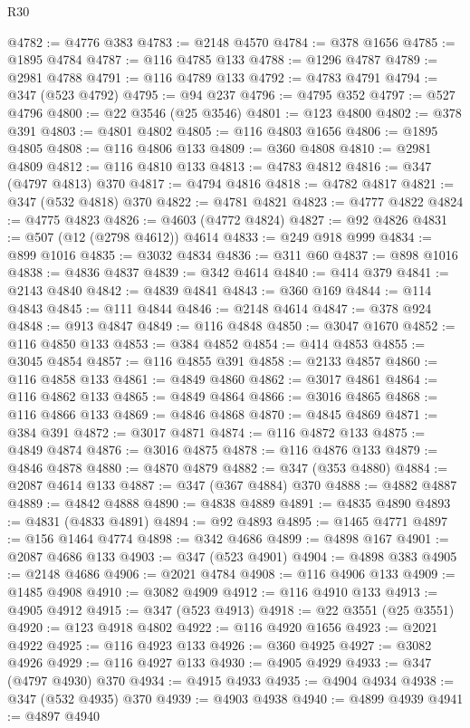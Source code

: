 \begin{lexlean}{R30}
\begin{coremodule}
@4782 := @4776 @383
@4783 := @2148 @4570
@4784 := @378 @1656
@4785 := @1895 @4784
@4787 := @116 @4785 @133
@4788 := @1296 @4787
@4789 := @2981 @4788
@4791 := @116 @4789 @133
@4792 := @4783 @4791
@4794 := @347 (@523 @4792)
@4795 := @94 @237
@4796 := @4795 @352
@4797 := @527 @4796
@4800 := @22 @3546 (@25 @3546)
@4801 := @123 @4800
@4802 := @378 @391
@4803 := @4801 @4802
@4805 := @116 @4803 @1656
@4806 := @1895 @4805
@4808 := @116 @4806 @133
@4809 := @360 @4808
@4810 := @2981 @4809
@4812 := @116 @4810 @133
@4813 := @4783 @4812
@4816 := @347 (@4797 @4813) @370
@4817 := @4794 @4816
@4818 := @4782 @4817
@4821 := @347 (@532 @4818) @370
@4822 := @4781 @4821
@4823 := @4777 @4822
@4824 := @4775 @4823
@4826 := @4603 (@4772 @4824)
@4827 := @92 @4826
@4831 := @507 (@12 (@2798 @4612)) @4614
@4833 := @249 @918 @999
@4834 := @899 @1016
@4835 := @3032 @4834
@4836 := @311 @60
@4837 := @898 @1016
@4838 := @4836 @4837
@4839 := @342 @4614
@4840 := @414 @379
@4841 := @2143 @4840
@4842 := @4839 @4841
@4843 := @360 @169
@4844 := @114 @4843
@4845 := @111 @4844
@4846 := @2148 @4614
@4847 := @378 @924
@4848 := @913 @4847
@4849 := @116 @4848
@4850 := @3047 @1670
@4852 := @116 @4850 @133
@4853 := @384 @4852
@4854 := @414 @4853
@4855 := @3045 @4854
@4857 := @116 @4855 @391
@4858 := @2133 @4857
@4860 := @116 @4858 @133
@4861 := @4849 @4860
@4862 := @3017 @4861
@4864 := @116 @4862 @133
@4865 := @4849 @4864
@4866 := @3016 @4865
@4868 := @116 @4866 @133
@4869 := @4846 @4868
@4870 := @4845 @4869
@4871 := @384 @391
@4872 := @3017 @4871
@4874 := @116 @4872 @133
@4875 := @4849 @4874
@4876 := @3016 @4875
@4878 := @116 @4876 @133
@4879 := @4846 @4878
@4880 := @4870 @4879
@4882 := @347 (@353 @4880)
@4884 := @2087 @4614 @133
@4887 := @347 (@367 @4884) @370
@4888 := @4882 @4887
@4889 := @4842 @4888
@4890 := @4838 @4889
@4891 := @4835 @4890
@4893 := @4831 (@4833 @4891)
@4894 := @92 @4893
@4895 := @1465 @4771
@4897 := @156 @1464 @4774
@4898 := @342 @4686
@4899 := @4898 @167
@4901 := @2087 @4686 @133
@4903 := @347 (@523 @4901)
@4904 := @4898 @383
@4905 := @2148 @4686
@4906 := @2021 @4784
@4908 := @116 @4906 @133
@4909 := @1485 @4908
@4910 := @3082 @4909
@4912 := @116 @4910 @133
@4913 := @4905 @4912
@4915 := @347 (@523 @4913)
@4918 := @22 @3551 (@25 @3551)
@4920 := @123 @4918 @4802
@4922 := @116 @4920 @1656
@4923 := @2021 @4922
@4925 := @116 @4923 @133
@4926 := @360 @4925
@4927 := @3082 @4926
@4929 := @116 @4927 @133
@4930 := @4905 @4929
@4933 := @347 (@4797 @4930) @370
@4934 := @4915 @4933
@4935 := @4904 @4934
@4938 := @347 (@532 @4935) @370
@4939 := @4903 @4938
@4940 := @4899 @4939
@4941 := @4897 @4940

\end{coremodule}
\end{lexlean}
